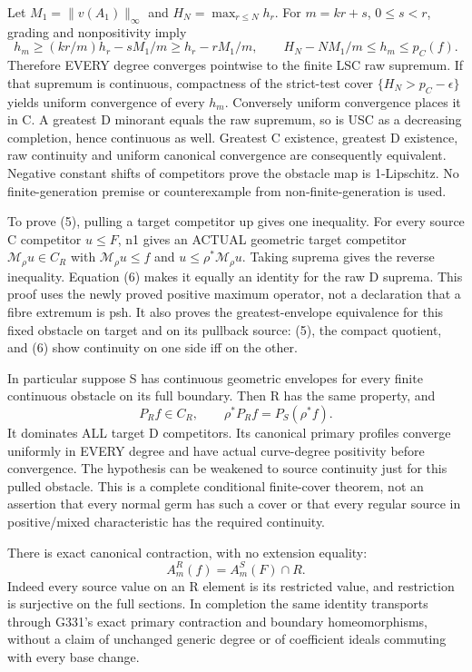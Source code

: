 Let $M_1=\|v(A_1)\|_\infty$ and $H_N=\max_{r\le N}h_r$.
For $m=kr+s$, $0\le s<r$, grading and nonpositivity imply
\[
 h_m\ge (kr/m)h_r-sM_1/m\ge h_r-rM_1/m,
 \qquad H_N-NM_1/m\le h_m\le p_C(f).
\]
Therefore EVERY degree converges pointwise to the finite LSC raw
supremum. If that supremum is continuous, compactness of the strict-test
cover $\{H_N>p_C-\epsilon\}$ yields uniform convergence of every $h_m$.
Conversely uniform convergence places it in C. A greatest D minorant
equals the raw supremum, so is USC as a decreasing completion, hence
continuous as well. Greatest C existence, greatest D existence, raw
continuity and uniform canonical convergence are consequently equivalent.
Negative constant shifts of competitors prove the obstacle map is
1-Lipschitz. No finite-generation premise or counterexample from
non-finite-generation is used.

To prove (5), pulling a target competitor up gives one inequality.
For every source C competitor $u\le F$, n1 gives an ACTUAL geometric
target competitor $\mathcal M_\rho u\in C_R$ with
$\mathcal M_\rho u\le f$ and $u\le\rho^*\mathcal M_\rho u$.
Taking suprema gives the reverse inequality. Equation (6) makes it
equally an identity for the raw D suprema. This proof uses the newly
proved positive maximum operator, not a declaration that a fibre extremum
is psh. It also proves the greatest-envelope equivalence for this fixed
obstacle on target and on its pullback source: (5), the compact quotient,
and (6) show continuity on one side iff on the other.

In particular suppose S has continuous geometric envelopes for every
finite continuous obstacle on its full boundary. Then R has the same
property, and
\[
      P_R f\in C_R,\qquad \rho^*P_R f=P_S(\rho^*f).          \tag{7}
\]
It dominates ALL target D competitors. Its canonical primary profiles
converge uniformly in EVERY degree and have actual curve-degree
positivity before convergence. The hypothesis can be weakened to source
continuity just for this pulled obstacle. This is a complete conditional
finite-cover theorem, not an assertion that every normal germ has such
a cover or that every regular source in positive/mixed characteristic
has the required continuity.

There is exact canonical contraction, with no extension equality:
\[
           A_m^R(f)=A_m^S(F)\cap R.                        \tag{8}
\]
Indeed every source value on an R element is its restricted value, and
restriction is surjective on the full sections. In completion the same
identity transports through G331's exact primary contraction and
boundary homeomorphisms, without a claim of unchanged generic degree or
of coefficient ideals commuting with every base change.

